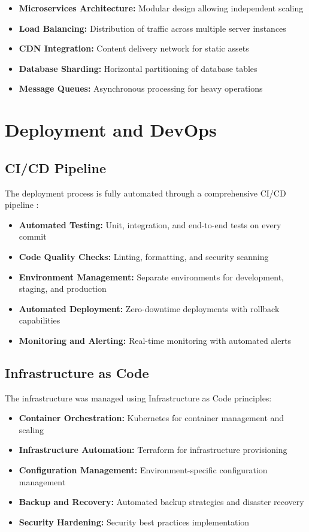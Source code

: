 \documentclass[conference]{IEEEtran}
\begin{document}
\begin{itemize}
    \item \textbf{Microservices Architecture:} Modular design allowing independent scaling
    \item \textbf{Load Balancing:} Distribution of traffic across multiple server instances
    \item \textbf{CDN Integration:} Content delivery network for static assets
    \item \textbf{Database Sharding:} Horizontal partitioning of database tables
    \item \textbf{Message Queues:} Asynchronous processing for heavy operations
\end{itemize}

\section{Deployment and DevOps}
\subsection{CI/CD Pipeline}
The deployment process is fully automated through a comprehensive CI/CD pipeline \cite{devops_practices}:

\begin{itemize}
    \item \textbf{Automated Testing:} Unit, integration, and end-to-end tests on every commit
    \item \textbf{Code Quality Checks:} Linting, formatting, and security scanning
    \item \textbf{Environment Management:} Separate environments for development, staging, and production
    \item \textbf{Automated Deployment:} Zero-downtime deployments with rollback capabilities
    \item \textbf{Monitoring and Alerting:} Real-time monitoring with automated alerts
\end{itemize}

\subsection{Infrastructure as Code}
The infrastructure was managed using Infrastructure as Code principles:

\begin{itemize}
    \item \textbf{Container Orchestration:} Kubernetes for container management and scaling
    \item \textbf{Infrastructure Automation:} Terraform for infrastructure provisioning
    \item \textbf{Configuration Management:} Environment-specific configuration management
    \item \textbf{Backup and Recovery:} Automated backup strategies and disaster recovery
    \item \textbf{Security Hardening:} Security best practices implementation
\end{itemize}
\end{document}
